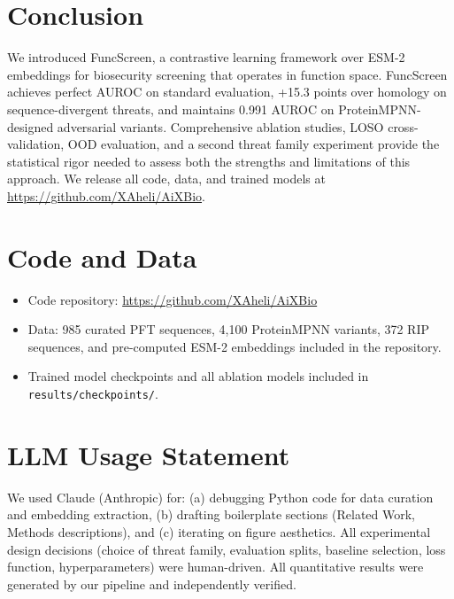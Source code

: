 \documentclass[11pt,a4paper]{article}
\begin{document}
\section{Conclusion}

We introduced FuncScreen, a contrastive learning framework over ESM-2 embeddings for biosecurity screening that operates in function space. FuncScreen achieves perfect AUROC on standard evaluation, +15.3 points over homology on sequence-divergent threats, and maintains 0.991 AUROC on ProteinMPNN-designed adversarial variants. Comprehensive ablation studies, LOSO cross-validation, OOD evaluation, and a second threat family experiment provide the statistical rigor needed to assess both the strengths and limitations of this approach. We release all code, data, and trained models at \url{https://github.com/XAheli/AiXBio}.

\section{Code and Data}

\begin{itemize}[leftmargin=*]
    \item Code repository: \url{https://github.com/XAheli/AiXBio}
    \item Data: 985 curated PFT sequences, 4,100 ProteinMPNN variants, 372 RIP sequences, and pre-computed ESM-2 embeddings included in the repository.
    \item Trained model checkpoints and all ablation models included in \texttt{results/checkpoints/}.
\end{itemize}

\section{LLM Usage Statement}

We used Claude (Anthropic) for: (a) debugging Python code for data curation and embedding extraction, (b) drafting boilerplate sections (Related Work, Methods descriptions), and (c) iterating on figure aesthetics. All experimental design decisions (choice of threat family, evaluation splits, baseline selection, loss function, hyperparameters) were human-driven. All quantitative results were generated by our pipeline and independently verified.
\end{document}
